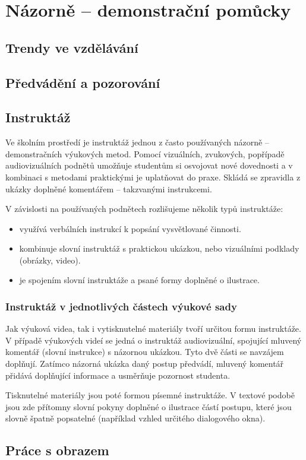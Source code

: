 \chapter{Názorně -- demonstrační pomůcky}


\section{Trendy ve vzdělávání}

\section{Předvádění a pozorování}

\section{Instruktáž}
Ve školním prostředí je instruktáž jednou z často používaných názorně -- demonstračních výukových metod.
Pomocí vizuálních, zvukových, popřípadě audiovizuálních podnětů umožňuje studentům si osvojovat nové dovednosti a v kombinaci s metodami praktickými je uplatňovat do praxe.
Skládá se zpravidla z ukázky doplněné komentářem -- takzvanými instrukcemi.

\noindent V závislosti na používaných podnětech rozlišujeme několik typů instruktáže:
\begin{itemize}[topsep=0pt]
    \setlength\itemsep{0em}
    \item {} využívá verbálních instrukcí k popsání vysvětlované činnosti.
    \item {} kombinuje slovní instruktáž s praktickou ukázkou, nebo vizuálními podklady (obrázky, video).
    \item {} je spojením slovní instruktáže a psané formy doplněné o ilustrace.
\end{itemize}

\subsection{Instruktáž v jednotlivých částech výukové sady}
Jak výuková videa, tak i vytisknutelné materiály tvoří určitou formu instruktáže.
V případě výukových videí se jedná o instruktáž audiovizuální, spojující mluvený komentář (slovní instrukce) s názornou ukázkou.
Tyto dvě části se navzájem doplňují.
Zatímco názorná ukázka daný postup předvádí, mluvený komentář přidává doplňující informace a usměrňuje pozornost studenta.

Tisknutelné materiály jsou poté formou písemné instruktáže.
V textové podobě jsou zde přítomny slovní pokyny doplněné o ilustrace částí postupu, které jsou slovně špatně popsatelné (například vzhled určitého dialogového okna).

\section{Práce s obrazem}

\newpage